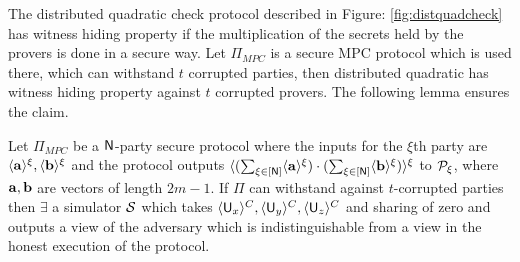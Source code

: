 The distributed quadratic check protocol described in Figure: \ref{fig:distquadcheck} has witness hiding property if the multiplication of the secrets held by the provers is done in a secure way. Let $\Pi_{MPC}$ is a secure MPC protocol which is used there, which can withstand $t$ corrupted parties, then distributed quadratic has witness hiding property against $t$ corrupted provers. The following lemma ensures the claim. 

\begin{lemma}\label{lem:WHquad}
	Let $\Pi_{MPC}$ be a $\mathsf{N}$-party secure protocol where the inputs for the $\xi$th party are $\langle{\bf a}\rangle^\xi, \langle{\bf b}\rangle^\xi$ and the protocol outputs $\langle{(\sum_{\xi\in[\mathsf{N}]}\langle{\bf a}\rangle^\xi)\cdot(\sum_{\xi\in[\mathsf{N}]}\langle{\bf b}\rangle^\xi)}\rangle^\xi$ to $\mathcal{P}_\xi$, where ${\bf a}, {\bf b}$ are vectors of length $2m-1$. If $\Pi$ can withstand against $t$-corrupted parties then $\exists$ a simulator $\mathcal{S}$ which takes $\langle{\mathsf{U}_x}\rangle^C, \langle{\mathsf{U}_y}\rangle^C, \langle{\mathsf{U}_z}\rangle^C$ and sharing of zero and outputs a view of the adversary which is indistinguishable from a view in the honest execution of the protocol.
\end{lemma}

